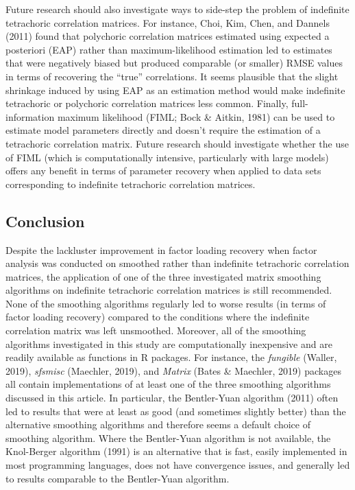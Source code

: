 \documentclass[
  english,
  man]{apa6}
\begin{document}
Future research should also investigate ways to side-step the problem of indefinite tetrachoric correlation matrices. For instance, Choi, Kim, Chen, and Dannels (2011) found that polychoric correlation matrices estimated using expected a posteriori (EAP) rather than maximum-likelihood estimation led to estimates that were negatively biased but produced comparable (or smaller) RMSE values in terms of recovering the \enquote{true} correlations. It seems plausible that the slight shrinkage induced by using EAP as an estimation method would make indefinite tetrachoric or polychoric correlation matrices less common. Finally, full-information maximum likelihood (FIML; Bock \& Aitkin, 1981) can be used to estimate model parameters directly and doesn't require the estimation of a tetrachoric correlation matrix. Future research should investigate whether the use of FIML (which is computationally intensive, particularly with large models) offers any benefit in terms of parameter recovery when applied to data sets corresponding to indefinite tetrachoric correlation matrices.

\hypertarget{conclusion}{%
\subsection{Conclusion}\label{conclusion}}

Despite the lackluster improvement in factor loading recovery when factor analysis was conducted on smoothed rather than indefinite tetrachoric correlation matrices, the application of one of the three investigated matrix smoothing algorithms on indefinite tetrachoric correlation matrices is still recommended. None of the smoothing algorithms regularly led to worse results (in terms of factor loading recovery) compared to the conditions where the indefinite correlation matrix was left unsmoothed. Moreover, all of the smoothing algorithms investigated in this study are computationally inexpensive and are readily available as functions in R packages. For instance, the \emph{fungible} (Waller, 2019), \emph{sfsmisc} (Maechler, 2019), and \emph{Matrix} (Bates \& Maechler, 2019) packages all contain implementations of at least one of the three smoothing algorithms discussed in this article. In particular, the Bentler-Yuan algorithm (2011) often led to results that were at least as good (and sometimes slightly better) than the alternative smoothing algorithms and therefore seems a default choice of smoothing algorithm. Where the Bentler-Yuan algorithm is not available, the Knol-Berger algorithm (1991) is an alternative that is fast, easily implemented in most programming languages, does not have convergence issues, and generally led to results comparable to the Bentler-Yuan algorithm.
\end{document}
